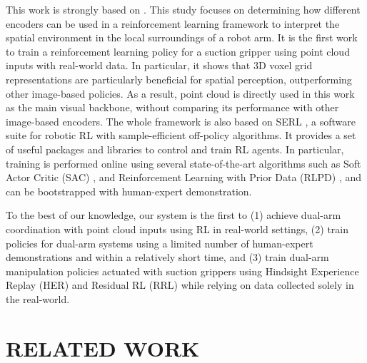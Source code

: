 \documentclass[letterpaper, 10 pt, conference]{ieeeconf}  %
\begin{document}
This work is strongly based on \cite{sutter2025comparisonvisualrepresentationsrealworld}. This study focuses on determining how different encoders can be used in a reinforcement learning framework to interpret the spatial environment in the local surroundings of a robot arm. 
It is the first work to train a reinforcement learning policy for a suction gripper using point cloud inputs with real-world data. 
In particular, it shows that 3D voxel grid representations are particularly beneficial for spatial perception, outperforming other image-based policies. 
As a result, point cloud is directly used in this work as the main visual backbone, without comparing its performance with other image-based encoders. 
The whole framework is also based on SERL \cite{luo2024serlsoftwaresuitesampleefficient}, a software suite for robotic RL with sample-efficient off-policy algorithms. It provides a set of useful packages and libraries to control and train RL agents. In particular, training is performed online using several state-of-the-art algorithms such as Soft Actor Critic (SAC) \cite{haarnoja2018softactorcriticoffpolicymaximum}, and Reinforcement Learning with Prior Data (RLPD) \cite{ball2023efficientonlinereinforcementlearning}, and can be bootstrapped with human-expert demonstration. 

To the best of our knowledge, our system is the first to (1) achieve dual-arm coordination with point cloud inputs using RL in real-world settings, (2) train policies for dual-arm systems using a limited number of human-expert demonstrations and within a relatively short time, and (3) train dual-arm manipulation policies actuated with suction grippers using Hindsight Experience Replay (HER) \cite{andrychowicz2018hindsightexperiencereplay} and Residual RL (RRL) \cite{johannink2018residualreinforcementlearningrobot} while relying on data collected solely in the real-world. 

\section{RELATED WORK} %
\end{document}
